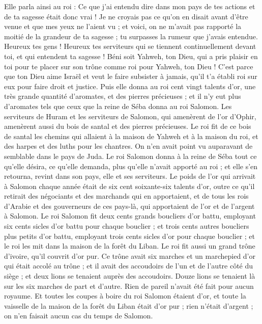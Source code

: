 \begin{multicols}{2}
Elle parla ainsi au roi : Ce que j'ai entendu dire dans mon pays de tes actions et de ta sagesse était donc vrai !
Je ne croyais pas ce qu'on en disait avant d'être venue et que mes yeux ne l'aient vu ; et voici, on ne m'avait pas rapporté la moitié de la grandeur de ta sagesse ; tu surpasses la rumeur que j'avais entendue.
Heureux tes gens ! Heureux tes serviteurs qui se tiennent continuellement devant toi, et qui entendent ta sagesse !
Béni soit Yahweh, ton Dieu, qui a pris plaisir en toi pour te placer sur son trône comme roi pour Yahweh, ton Dieu ! C'est parce que ton Dieu aime Israël et veut le faire subsister à jamais, qu'il t'a établi roi sur eux pour faire droit et justice.
Puis elle donna au roi cent vingt talents d'or, une très grande quantité d'aromates, et des pierres précieuses ; et il n'y eut plus d'aromates tels que ceux que la reine de Séba donna au roi Salomon.
Les serviteurs de Huram et les serviteurs de Salomon, qui amenèrent de l'or d'Ophir, amenèrent aussi du bois de santal et des pierres précieuses.
Le roi fit de ce bois de santal les chemins qui allaient à la maison de Yahweh et à la maison du roi, et des harpes et des luths pour les chantres. On n'en avait point vu auparavant de semblable dans le pays de Juda.
Le roi Salomon donna à la reine de Séba tout ce qu'elle désira, ce qu'elle demanda, plus qu'elle n'avait apporté au roi ; et elle s'en retourna, revint dans son pays, elle et ses serviteurs.
Le poids de l'or qui arrivait à Salomon chaque année était de six cent soixante-six talents d'or,
outre ce qu'il retirait des négociants et des marchands qui en apportaient, et de tous les rois d'Arabie et des gouverneurs de ces pays-là, qui apportaient de l'or et de l'argent à Salomon.
Le roi Salomon fit deux cents grands boucliers d'or battu, employant six cents sicles d'or battu pour chaque bouclier ;
et trois cents autres boucliers plus petits d'or battu, employant trois cents sicles d'or pour chaque bouclier ; et le roi les mit dans la maison de la forêt du Liban.
Le roi fit aussi un grand trône d'ivoire, qu'il couvrit d'or pur.
Ce trône avait six marches et un marchepied d'or qui était accolé au trône ; et il avait des accoudoirs de l'un et de l'autre côté du siège ; et deux lions se tenaient auprès des accoudoirs.
Douze lions se tenaient là sur les six marches de part et d'autre. Rien de pareil n'avait été fait pour aucun royaume.
Et toutes les coupes à boire du roi Salomon étaient d'or, et toute la vaisselle de la maison de la forêt du Liban était d'or pur ; rien n'était d'argent ; on n'en faisait aucun cas du temps de Salomon.

\end{multicols}

